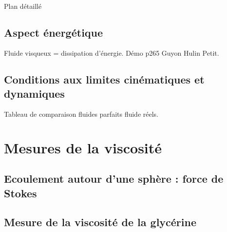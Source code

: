 \begin{reportBlock}{Plan détaillé}
\subsection{Aspect énergétique}
Fluide visqueux = dissipation d'énergie. Démo p265 Guyon Hulin Petit.
\subsection{Conditions aux limites cinématiques et dynamiques}
Tableau de comparaison fluides parfaits fluide réels.

\section{Mesures de la viscosité}
\subsection{Ecoulement autour d'une sphère : force de Stokes}
\subsection{Mesure de la viscosité de la glycérine}

\end{reportBlock}